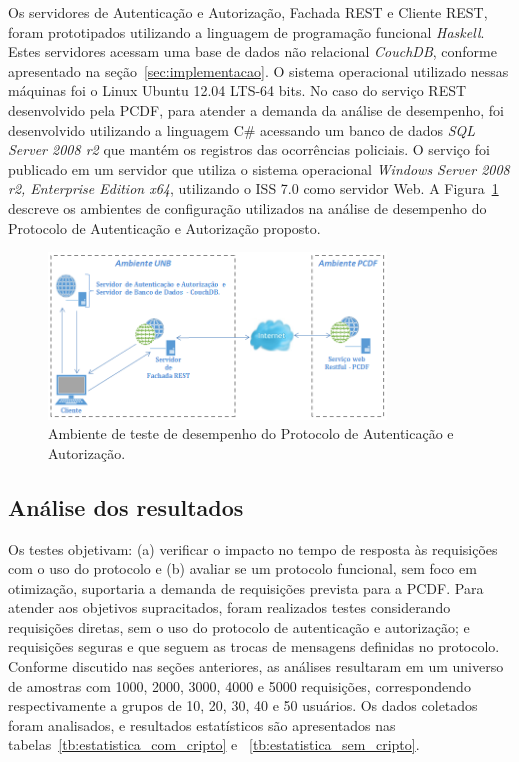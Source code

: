 Os servidores de Autenticação e Autorização, Fachada REST e Cliente REST, foram prototipados utilizando a linguagem de programação funcional \emph{Haskell}. Estes servidores acessam uma base de dados não relacional \emph{CouchDB}, conforme apresentado na seção~\ref{sec:implementacao}.
O sistema operacional utilizado nessas máquinas foi o Linux Ubuntu 12.04 LTS-64 bits. No caso do serviço REST desenvolvido pela PCDF,
para atender a demanda da análise de desempenho, foi desenvolvido utilizando a linguagem C\# acessando um banco de dados \emph{SQL Server 2008 r2} que mant\'{e}m os registros das ocorr\^{e}ncias policiais. O serviço foi publicado em um servidor que utiliza o sistema operacional
\emph{Windows Server 2008 r2, Enterprise Edition x64}, utilizando o ISS 7.0 como servidor Web.
A Figura~\ref{fig:ambiente_teste} descreve os ambientes de configuração utilizados na análise de desempenho do Protocolo de Autenticação e Autorização proposto.


\begin{figure}[!htb]
\centering
\includegraphics[width=0.8\textwidth]{ambiente_teste_desempenho.png}
\caption{Ambiente de teste de desempenho do Protocolo de Autenticação e Autorização.}
\label{fig:ambiente_teste}
\end{figure}

\subsection{Análise dos resultados}

Os testes objetivam: (a) verificar o impacto no tempo de resposta às requisições com o uso do protocolo e (b) avaliar se um protocolo funcional, sem foco em otimização, suportaria a demanda de requisi\c c\~{o}es prevista para a PCDF. Para atender aos objetivos supracitados, foram realizados testes considerando requisi\c c\~{o}es diretas, sem o uso do protocolo de autentica\c c\~{a}o e autoriza\c c\~{a}o; e requisi\c c\~{o}es seguras e que seguem as trocas de mensagens definidas no protocolo. Conforme discutido nas se\c c\~{o}es anteriores, as an\'{a}lises resultaram em um universo de amostras com 1000, 2000, 3000, 4000 e 5000 requisi\c c\~{o}es, correspondendo respectivamente a grupos de 10, 20, 30, 40 e 50 usuários.
Os dados coletados foram analisados, e resultados estatísticos são apresentados nas  tabelas~\ref{tb:estatistica_com_cripto} e ~\ref{tb:estatistica_sem_cripto}.

